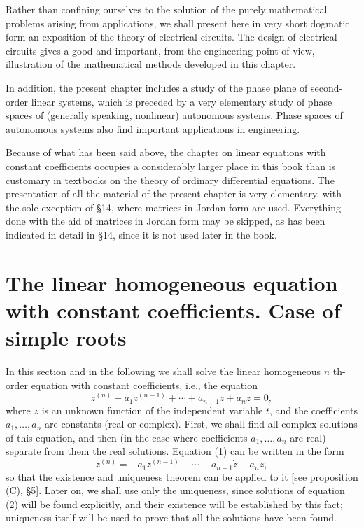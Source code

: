 \documentclass[10pt,a5paper]{book}
\theoremstyle{plain}
\theoremstyle{definition}
\theoremstyle{remark}
\begin{document}
Rather than confining ourselves to the solution of the purely mathematical problems arising from applications, we shall present here in very short dogmatic form an exposition of the theory of electrical circuits. The design of electrical circuits gives a good and important, from the engineering point of view, illustration of the mathematical methods developed in this chapter.

In addition, the present chapter includes a study of the phase plane of second-order linear systems, which is preceded by a very elementary study of phase spaces of (generally speaking, nonlinear) autonomous systems. Phase spaces of autonomous systems also find important applications in engineering.

Because of what has been said above, the chapter on linear equations with constant coefficients occupies a considerably larger place in this book than is customary in textbooks on the theory of ordinary differential
equations. The presentation of all the material of the present chapter is very elementary, with the sole exception of §14, where matrices in Jordan form are used. Everything done with the aid of matrices in Jordan form may be skipped, as has been indicated in detail in §14, since it is not used later in the book.

\section{The linear homogeneous equation with constant coefficients. Case of simple roots}
In this section and in the following we shall solve the linear homogeneous $n$ th-order equation with constant coefficients, i.e., the equation
\begin{equation*}
z^{(n)}+a_{1} z^{(n-1)}+\cdots+a_{n-1} \dot{z}+a_{n} z=0, \tag{1}
\end{equation*}
where $z$ is an unknown function of the independent variable $t$, and the coefficients $a_{1}, \ldots, a_{n}$ are constants (real or complex). First, we shall find all complex solutions of this equation, and then (in the case where coefficients $a_{1}, \ldots, a_{n}$ are real) separate from them the real solutions. Equation (1) can be written in the form
\begin{equation*}
z^{(n)}=-a_{1} z^{(n-1)}-\cdots-a_{n-1} \dot{z}-a_{n} z, \tag{2}
\end{equation*}
so that the existence and uniqueness theorem can be applied to it [see proposition (C), §5]. Later on, we shall use only the uniqueness, since solutions of equation (2) will be found explicitly, and their existence will be established by this fact; uniqueness itself will be used to prove that all the solutions have been found.
\end{document}
